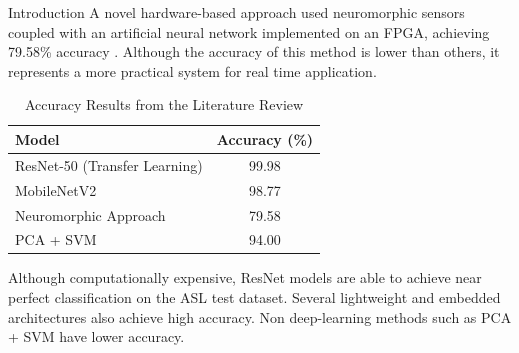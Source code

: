 \documentclass[12pt, a4paper]{article}
\begin{document}
\begin{section}{Introduction}
    A novel hardware-based approach used neuromorphic sensors coupled with an artificial neural network implemented on an FPGA, achieving 79.58\% accuracy \cite{mdpi2017neuromorphic}. Although the accuracy of this method is lower than others, it represents a more practical system for real time application.
    
    \begin{table}[H]
    \centering
    \caption{Accuracy Results from the Literature Review}
    \label{tab:litreview}
    \begin{tabular}{|l|c|}
    \hline
    Model & Accuracy (\%) \\
    \hline
    ResNet-50 (Transfer Learning) \cite{mdpi2023resnet} & 99.98 \\
    MobileNetV2 \cite{techscience2022mobilenet} & 98.77 \\
    Neuromorphic Approach \cite{mdpi2017neuromorphic} & 79.58 \\
    PCA + SVM \cite{mdpi2023resnet} & 94.00 \\
    \hline
    \end{tabular}
    \end{table}
    Although computationally expensive, ResNet models are able to achieve near perfect classification on the ASL test dataset. Several lightweight and embedded architectures also achieve high accuracy. Non deep-learning methods such as PCA + SVM have lower accuracy.

\end{section}
\end{document}
